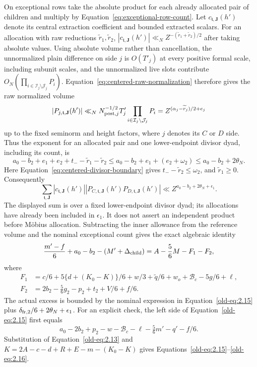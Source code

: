 \documentclass[12pt]{article}
\begin{document}
On exceptional rows take the absolute product for each already
allocated pair of children and multiply by
Equation~\eqref{eq:exceptional-row-count}.  Let
\(c_{\mathfrak t,\mathbf J}(h')\) denote its central extraction
coefficient and bounded extracted scalars.  For an allocation with raw
reductions \(\widetilde r_1,\widetilde r_2\),
\(|c_{\mathfrak t,\mathbf J}(h')|\ll_N
 Z^{-(\widetilde r_1+\widetilde r_2)/2}\) after taking absolute values.
Using absolute volume rather than cancellation, the unnormalized plain
difference on side \(j\) is \(O(T'_j)\) at every positive formal scale,
including subunit scales, and the unnormalized live slots contribute
\(O_N(\prod_{i\in\mathcal I_j\setminus\mathcal J_j}P_i)\).
Equation~\eqref{eq:centered-raw-normalization} therefore gives the raw
normalized volume
\[
 |P_{j,\mathfrak t,\mathbf J}(h')|
 \ll_N N_{{\rm post},j}^{-1/2}T'_j
             \prod_{i\in\mathcal I_j\setminus\mathcal J_j}P_i
 =Z^{(\alpha_j-\widetilde r_j)/2+e_j}
\]
up to the fixed seminorm and height factors, where \(j\) denotes its
\(C\) or \(D\) side.  Thus the exponent for an allocated pair and one
lower-endpoint divisor dyad, including its count, is
\[
 a_0-b_2+e_1+e_2+t_- -\widetilde r_1-\widetilde r_2
 \le a_0-b_2+e_1+(e_2+\omega_2)
 \le a_0-b_2+2\theta_N.
\]
Here Equation~\eqref{eq:centered-divisor-boundary} gives
\(t_- -\widetilde r_2\le\omega_2\), and \(\widetilde r_1\ge0\).
Consequently
\[
 \sum_{\mathfrak t,\mathbf J}
 |c_{\mathfrak t,\mathbf J}(h')|
 |P_{C,\mathfrak t,\mathbf J}(h')
       P_{D,\mathfrak t,\mathbf J}(h')|
 \ll Z^{a_0-b_2+2\theta_N+\epsilon_1}.
\]
The displayed sum is over a fixed lower-endpoint divisor dyad; its
allocations have already been included in
\(\epsilon_1\).  It does not assert an independent product before
M\"obius allocation.  Subtracting the inner allowance from the
reference volume and the nominal exceptional count gives the exact
algebraic identity
\begin{equation}
 \frac{m'-f}{6}+a_0-b_2-(M'+\Delta_{\rm child})
 =A-\frac56M-F_1-F_2,
 \label{old-eq:2.15}
\end{equation}
where
\begin{equation}
 \begin{aligned}
 F_1&=c/6+5\{d+(K_0-K)\}/6+w/3+\widetilde q/6
       +w_o+\mathcal B_c-5g/6+\ell,\\
 F_2&=2b_2-\tfrac56g_2-p_2+t_2+V/6+f/6.
 \end{aligned}
 \label{old-eq:2.16}
\end{equation}
The actual excess is bounded by the nominal expression in
Equation~\eqref{old-eq:2.15} plus
\(\delta_{{\rm fr},2}/6+2\theta_N+\epsilon_1\).
For an explicit check, the left side of
Equation~\eqref{old-eq:2.15} first equals
\[
 a_0-2b_2+p_2-w-\mathcal B_c-\ell
       -\tfrac56m'-q'-f/6.
\]
Substitution of Equation~\eqref{old-eq:2.13} and
\(K=2A-c-d+R+E-m-(K_0-K)\) gives
Equations~\eqref{old-eq:2.15}--\eqref{old-eq:2.16}.
\end{document}

